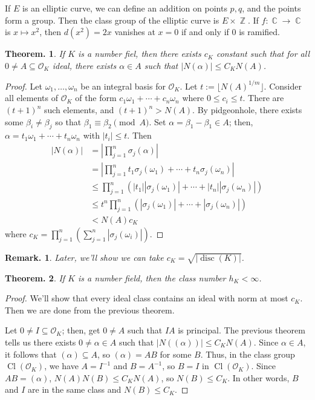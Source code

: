 \documentclass[11pt, a4paper]{memoir}
\DeclareMathOperator{\Z}{{\mathbb{Z}}}
\DeclareMathOperator{\C}{{\mathbb{C}}}
\theoremstyle{change}
\newtheorem{theorem}{Theorem.}[section]
\theoremstyle{plain}
\theoremstyle{nonumberplain}
\newtheorem{remark}{Remark.}
\newtheorem{proof}{Proof}
\DeclareMathOperator{\disc}{disc}
\DeclareMathOperator{\Cl}{Cl}
\begin{document}
If $E$ is an elliptic curve, we can define an addition on points $p,q$, and the points form a group.
Then the class group of the elliptic curve is $E\times\Z$.
If $f:\C\to\C$ is $x\mapsto x^2$, then $d(x^2)=2x$ vanishes at $x=0$ if and only if $0$ is ramified.
\begin{theorem}
    If $K$ is a number fiel, then there exists $c_K$ constant such that for all $0\neq A\subseteq\mathcal{O}_K$ ideal, there exists $\alpha\in A$ such that $|N(\alpha)|\leq C_KN(A)$.
\end{theorem}
\begin{proof}
    Let $\omega_1,\ldots,\omega_n$ be an integral basis for $\mathcal{O}_K$.
    Let $t:=\lfloor N(A)^{1/m}\rfloor$.
    Consider all elements of $\mathcal{O}_K$ of the form $c_1\omega_1+\cdots+c_n\omega_n$ where $0\leq c_i\leq t$.
    There are $(t+1)^n$ such elements, and $(t+1)^n>N(A)$.
    By pidgeonhole, there exists some $\beta_i\neq\beta_j$ so that $\beta_1\equiv\beta_2\pmod{A}$.
    Set $\alpha=\beta_1-\beta_1\in A$; then, $\alpha=t_1\omega_1+\cdots+t_n\omega_n$ with $|t_i|\leq t$.
    Then
    \begin{align*}
        |N(\alpha)| &= \left\lvert\prod_{j=1}^n\sigma_j(\alpha)\right\rvert\\
                    &= \left\lvert\prod_{j=1}^nt_1\sigma_j(\omega_1)+\cdots+t_n\sigma_j(\omega_n)\right\rvert\\
                    &\leq \prod_{j=1}^n\left(|t_1||\sigma_j(\omega_1)|+\cdots+|t_n||\sigma_j(\omega_n)|\right)\\
                    &\leq t^n\prod_{j=1}^n(|\sigma_j(\omega_1)|+\cdots+|\sigma_j(\omega_n)|)\\
                    &<N(A)c_K
    \end{align*}
    where $c_K=\prod_{j=1}^n\left(\sum_{j=1}^n|\sigma_j(\omega_i)|\right)$.
\end{proof}
\begin{remark}
    Later, we'll show we can take $c_K=\sqrt{|\disc(K)|}$.
\end{remark}
\begin{theorem}
    If $K$ is a number field, then the class number $h_K<\infty$.
\end{theorem}
\begin{proof}
    We'll show that every ideal class contains an ideal with norm at most $c_K$.
    Then we are done from the previous theorem.

    Let $0\neq I\subseteq\mathcal{O}_K$; then, get $0\neq A$ such that $IA$ is principal.
    The previous theorem tells us there exists $0\neq\alpha\in A$ such that $|N((\alpha))|\leq C_KN(A)$.
    Since $\alpha\in A$, it follows that $(\alpha)\subseteq A$, so $(\alpha)=AB$ for some $B$.
    Thus, in the class group $\Cl(\mathcal{O}_K)$, we have $A=I^{-1}$ and $B=A^{-1}$, so $B=I$ in $\Cl(\mathcal{O}_K)$.
    Since $AB=(\alpha)$, $N(A)N(B)\leq C_KN(A)$, so $N(B)\leq C_K$.
    In other words, $B$ and $I$ are in the same class and $N(B)\leq C_K$.
\end{proof}
\end{document}
